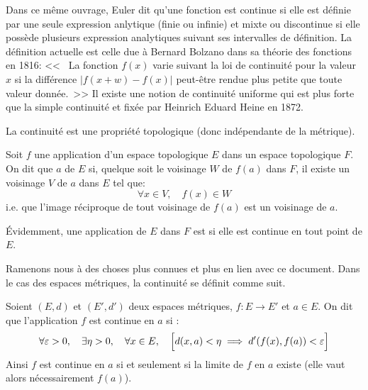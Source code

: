 \begin{histoire}
Dans ce même ouvrage, Euler
dit qu'une fonction est continue si elle est définie par une seule expression anlytique
(finie ou infinie) et mixte ou discontinue si elle possède plusieurs expression analytiques
suivant ses intervalles de définition.
\ifVersionDuDocEstVincent\medskip\fi
La définition actuelle est celle due à Bernard Bolzano
 dans sa théorie des
fonctions en 1816: <<~ La fonction $f(x)$ varie suivant la loi de continuité pour la valeur $x$
si la différence $| f(x + w) -f(x) |$ peut-être rendue plus petite que toute valeur donnée.~>>
Il existe une notion de continuité uniforme qui est plus forte que la simple continuité
et fixée par Heinrich Eduard Heine
 en 1872.
\end{histoire}


\ifVersionDuDocEstVincent\medskip\fi
La continuité est une propriété topologique (donc indépendante de la métrique).

\ifVersionDuDocEstVincent\medskip\fi
\begin{definition}
Soit $f$ une application d'un espace topologique $E$ dans un espace topologique
$F$.
On dit que  $a$ de $E$ si, quelque
soit le voisinage $W$ de $f(a)$ dans $F$, il existe un voisinage $V$ de $a$ dans $E$
tel que:
\begin{equation}
\forall x\in V, \quad f(x)\in W
\end{equation}
i.e. que l'image réciproque de tout voisinage de $f(a)$ est un voisinage de $a$.
\end{definition}


\ifVersionDuDocEstVincent\medskip\fi
Évidemment, une  application de $E$ dans $F$ est  si
elle est continue en tout point de $E$.

\ifVersionDuDocEstVincent\medskip\fi
Ramenons nous à des choses plus connues et plus en lien avec ce document.
Dans le cas des espaces métriques, la continuité se définit comme suit.

\begin{definition}
Soient $(E,d)$ et $(E',d')$ deux espaces métriques, $f : E \to E'$ et $a \in E$.
On dit que l'application $f$ est continue en $a$ si :
\begin{equation}
    \forall \varepsilon > 0, \quad \exists \eta > 0, \quad \forall x \in E, \quad \Bigl[d(x,a)<\eta \implies d'(f(x),f(a))<\varepsilon\Bigr]
\end{equation}
Ainsi $f$ est continue en $a$ si et seulement si la limite de $f$ en $a$ existe
(elle vaut alors nécessairement $f(a)$).
\end{definition}

